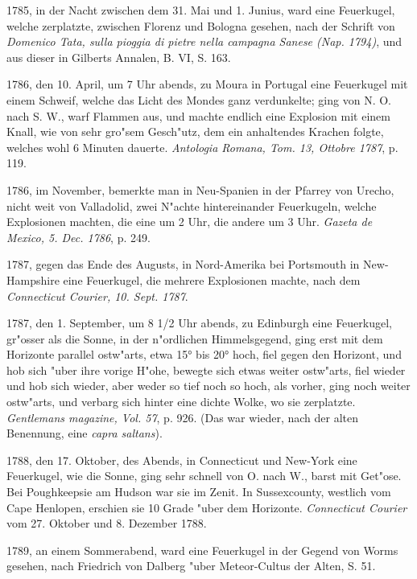 \documentclass[a4paper, 11pt, oneside, polutonikogreek, german]{article}
\begin{document}
1785, in der Nacht zwischen dem 31. Mai und 1. Junius, ward eine Feuerkugel, welche zerplatzte, zwischen Florenz und Bologna gesehen, nach der Schrift von \emph{Domenico Tata, sulla pioggia di pietre nella campagna Sanese (Nap. 1794)}, und aus dieser in Gilberts Annalen, B. VI, S. 163.

1786, den 10. April, um 7 Uhr abends, zu Moura in Portugal eine Feuerkugel mit einem Schweif, welche das Licht des Mondes ganz verdunkelte; ging von N. O. nach S. W., warf Flammen aus, und machte endlich eine Explosion mit einem Knall, wie von sehr gro"sem Gesch"utz, dem ein anhaltendes Krachen folgte, welches wohl 6 Minuten dauerte. \emph{Antologia Romana, Tom. 13, Ottobre 1787}, p. 119.

1786, im November, bemerkte man in Neu-Spanien in der Pfarrey von Urecho, nicht weit von Valladolid, zwei N"achte hintereinander Feuerkugeln, welche Explosionen machten, die eine um 2 Uhr, die andere um 3 Uhr. \emph{Gazeta de Mexico, 5. Dec. 1786}, p. 249.

1787, gegen das Ende des Augusts, in Nord-Amerika bei Portsmouth in New-Hampshire eine Feuerkugel, die mehrere Explosionen machte, nach dem \emph{Connecticut Courier, 10. Sept. 1787}.

1787, den 1. September, um 8 1/2 Uhr abends, zu Edinburgh eine Feuerkugel, gr"osser als die Sonne, in der n"ordlichen Himmelsgegend, ging erst mit dem Horizonte parallel ostw"arts, etwa 15° bis 20° hoch, fiel gegen den Horizont, und hob sich "uber ihre vorige H"ohe, bewegte sich etwas weiter ostw"arts, fiel wieder und hob sich wieder, aber weder so tief noch so hoch, als vorher, ging noch weiter ostw"arts, und verbarg sich hinter eine dichte Wolke, wo sie zerplatzte. \emph{Gentlemans magazine, Vol. 57}, p. 926. (Das war wieder, nach der alten Benennung, eine \emph{capra saltans}).

1788, den 17. Oktober, des Abends, in Connecticut und New-York eine Feuerkugel, wie die Sonne, ging sehr schnell von O. nach W., barst mit Get"ose. Bei Poughkeepsie am Hudson war sie im Zenit. In Sussexcounty, westlich vom Cape Henlopen, erschien sie 10 Grade "uber dem Horizonte. \emph{Connecticut Courier} vom 27. Oktober und 8. Dezember 1788.

1789, an einem Sommerabend, ward eine Feuerkugel in der Gegend von Worms gesehen, nach Friedrich von Dalberg "uber Meteor-Cultus der Alten, S. 51.
\end{document}
